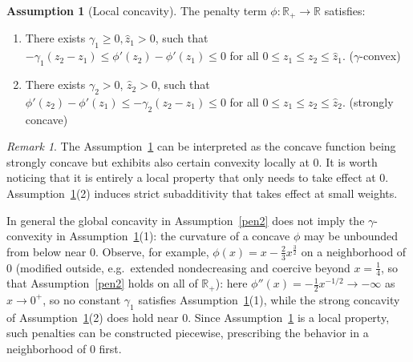 \documentclass[11pt]{amsart}
\theoremstyle{definition}
\newtheorem{assumption}[theorem]{Assumption}
\theoremstyle{remark}
\newtheorem{remark}[theorem]{Remark}
\begin{document}
\begin{assumption}[Local concavity]
 \label{pen3}
 The penalty term $\phi: \mathbb{R}_+ \rightarrow \mathbb{R}$ satisfies:
 \begin{enumerate}
  	\item There exists $\gamma_1 \ge 0, \hat{z}_1 > 0$, such that $  -\gamma_1(z_2 - z_1) \le \phi'(z_2) - \phi'(z_1) \le 0$ for all $0\le z_1 \le z_2 \le \hat{z}_1. $ ($\gamma$-convex)
 	\item There exists $\gamma_2 > 0$, $\hat{z}_2 > 0$, such that $\phi'(z_2) - \phi'(z_1) \le -\gamma_2(z_2 - z_1) \le 0 $ for all  $0 \le z_1 \le z_2 \le \hat{z}_2. $ (strongly concave)
 \end{enumerate}
 \end{assumption}
 \begin{remark}
 The Assumption~\ref{pen3} can be interpreted as the concave function being strongly concave but exhibits also certain convexity locally at 0. It is worth noticing that it is entirely a local property that only needs to take effect at 0. Assumption~\ref{pen3}(2) induces  strict subadditivity that takes effect at small weights. \par
 In general the global concavity in Assumption~\ref{pen2} does not imply the $\gamma$-convexity in Assumption~\ref{pen3}(1): the curvature of a concave $\phi$ may be unbounded from below near $0$.
 Observe, for example, $\phi(x) = x - \frac{2}{3}x^{\frac{3}{2}}$ on a neighborhood of $0$ (modified outside, e.g.\ extended nondecreasing and coercive beyond $x = \frac{1}{4}$, so that Assumption~\ref{pen2} holds on all of $\mathbb{R}_+$): here $\phi''(x) = -\frac{1}{2}x^{-1/2} \rightarrow -\infty$ as $x \rightarrow 0^+$, so no constant $\gamma_1$ satisfies Assumption~\ref{pen3}(1), while the strong concavity of Assumption~\ref{pen3}(2) does hold near $0$. Since Assumption~\ref{pen3} is a local property, such penalties can be constructed piecewise, prescribing the behavior in a neighborhood of $0$ first. 
  
 \end{remark}
\end{document}
